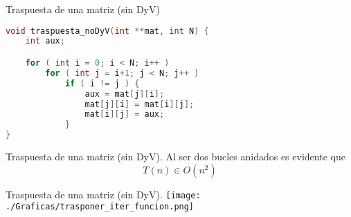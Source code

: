 \documentclass[10pt, xcolor=table]{beamer}
\begin{document}
\begin{frame}[fragile]{Traspuesta de una matriz (sin DyV)}
\begin{lstlisting}[language=C]
void traspuesta_noDyV(int **mat, int N) {
    int aux;

    for ( int i = 0; i < N; i++ )
        for ( int j = i+1; j < N; j++ )
            if ( i != j ) {
                aux = mat[j][i];
                mat[j][i] = mat[i][j];
                mat[i][j] = aux;
            }
}
\end{lstlisting}
\end{frame}

\begin{frame}[fragile]{Traspuesta de una matriz (sin DyV). }
Al ser dos bucles anidados es evidente que $$T(n) \in O(n^2)$$

\end{frame}



\begin{frame}[fragile]{Traspuesta de una matriz (sin DyV). }
\texttt{[image: ./Graficas/trasponer\_iter\_funcion.png]}
\end{frame}
\end{document}
